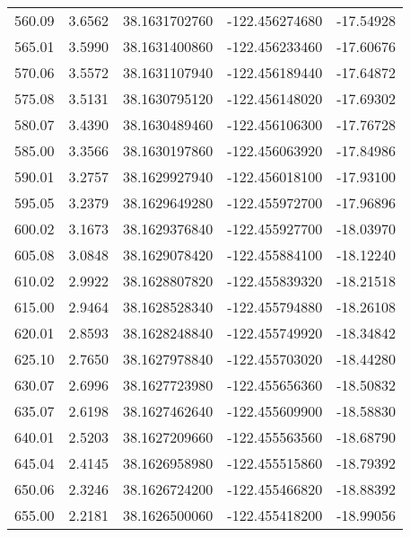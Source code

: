 \begin{longtable}{p{2.5cm}p{2.5cm}p{3cm}p{3cm}p{2.5cm}}
       560.09  & 	 3.6562 &               38.1631702760  &   -122.456274680   &	-17.54928 \\
       565.01  & 	 3.5990 &               38.1631400860  &   -122.456233460   &	-17.60676 \\
       570.06  & 	 3.5572 &               38.1631107940  &   -122.456189440   &	-17.64872 \\
       575.08  & 	 3.5131 &               38.1630795120  &   -122.456148020   &	-17.69302 \\
       580.07  & 	 3.4390 &               38.1630489460  &   -122.456106300   &	-17.76728 \\
       585.00  & 	 3.3566 &               38.1630197860  &   -122.456063920   &	-17.84986 \\
       590.01  & 	 3.2757 &               38.1629927940  &   -122.456018100   &	-17.93100 \\
       595.05  & 	 3.2379 &               38.1629649280  &   -122.455972700   &	-17.96896 \\
       600.02  & 	 3.1673 &               38.1629376840  &   -122.455927700   &	-18.03970 \\
       605.08  & 	 3.0848 &               38.1629078420  &   -122.455884100   &	-18.12240 \\
       610.02  & 	 2.9922 &               38.1628807820  &   -122.455839320   &	-18.21518 \\
       615.00  & 	 2.9464 &               38.1628528340  &   -122.455794880   &	-18.26108 \\
       620.01  & 	 2.8593 &               38.1628248840  &   -122.455749920   &	-18.34842 \\
       625.10  & 	 2.7650 &               38.1627978840  &   -122.455703020   &	-18.44280 \\
       630.07  & 	 2.6996 &               38.1627723980  &   -122.455656360   &	-18.50832 \\
       635.07  & 	 2.6198 &               38.1627462640  &   -122.455609900   &	-18.58830 \\
       640.01  & 	 2.5203 &               38.1627209660  &   -122.455563560   &	-18.68790 \\
       645.04  & 	 2.4145 &               38.1626958980  &   -122.455515860   &	-18.79392 \\
       650.06  & 	 2.3246 &               38.1626724200  &   -122.455466820   &	-18.88392 \\
       655.00  & 	 2.2181 &               38.1626500060  &   -122.455418200   &	-18.99056 \\

\end{longtable}
